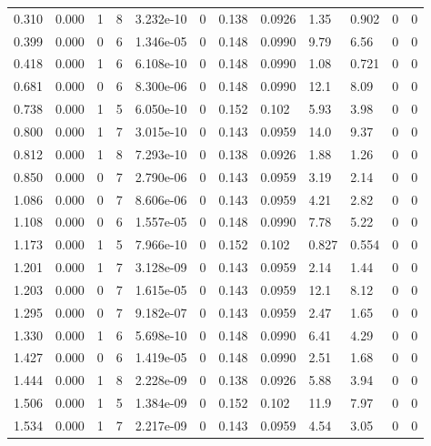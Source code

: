 \documentclass[preview]{standalone}
\begin{document}
{{\begin{tabular}{L{1.2cm}C{1.2cm} C{0.3cm}C{0.5cm} C{1.4cm}C{1.4cm} C{1.4cm}C{1.4cm} C{1.6cm}C{1.6cm} C{1.6cm}C{1.6cm}}
  0.310  &  0.000  & 1     &  8 &  3.232e-10  & 0  &  0.138&   0.0926& 1.35 & 0.902   &  0 & 0  \\ 
  0.399  &  0.000  & 0     &  6 &  1.346e-05  & 0  &  0.148&   0.0990& 9.79 & 6.56   &  0 & 0  \\ 
  0.418  &  0.000  & 1     &  6 &  6.108e-10  & 0  &  0.148&   0.0990& 1.08 & 0.721   &  0 & 0  \\ 
  0.681  &  0.000  & 0     &  6 &  8.300e-06  & 0  &  0.148&   0.0990& 12.1 & 8.09   &  0 & 0  \\ 
  0.738  &  0.000  & 1     &  5 &  6.050e-10  & 0  &  0.152&   0.102& 5.93 & 3.98   &  0 & 0  \\ 
  0.800  &  0.000  & 1     &  7 &  3.015e-10  & 0  &  0.143&   0.0959& 14.0 & 9.37   &  0 & 0  \\ 
  0.812  &  0.000  & 1     &  8 &  7.293e-10  & 0  &  0.138&   0.0926& 1.88 & 1.26   &  0 & 0  \\ 
  0.850  &  0.000  & 0     &  7 &  2.790e-06  & 0  &  0.143&   0.0959& 3.19 & 2.14   &  0 & 0  \\ 
  1.086  &  0.000  & 0     &  7 &  8.606e-06  & 0  &  0.143&   0.0959& 4.21 & 2.82   &  0 & 0  \\ 
  1.108  &  0.000  & 0     &  6 &  1.557e-05  & 0  &  0.148&   0.0990& 7.78 & 5.22   &  0 & 0  \\ 
  1.173  &  0.000  & 1     &  5 &  7.966e-10  & 0  &  0.152&   0.102& 0.827 & 0.554   &  0 & 0  \\ 
  1.201  &  0.000  & 1     &  7 &  3.128e-09  & 0  &  0.143&   0.0959& 2.14 & 1.44   &  0 & 0  \\ 
  1.203  &  0.000  & 0     &  7 &  1.615e-05  & 0  &  0.143&   0.0959& 12.1 & 8.12   &  0 & 0  \\ 
  1.295  &  0.000  & 0     &  7 &  9.182e-07  & 0  &  0.143&   0.0959& 2.47 & 1.65   &  0 & 0  \\ 
  1.330  &  0.000  & 1     &  6 &  5.698e-10  & 0  &  0.148&   0.0990& 6.41 & 4.29   &  0 & 0  \\ 
  1.427  &  0.000  & 0     &  6 &  1.419e-05  & 0  &  0.148&   0.0990& 2.51 & 1.68   &  0 & 0  \\ 
  1.444  &  0.000  & 1     &  8 &  2.228e-09  & 0  &  0.138&   0.0926& 5.88 & 3.94   &  0 & 0  \\ 
  1.506  &  0.000  & 1     &  5 &  1.384e-09  & 0  &  0.152&   0.102& 11.9 & 7.97   &  0 & 0  \\ 
  1.534  &  0.000  & 1     &  7 &  2.217e-09  & 0  &  0.143&   0.0959& 4.54 & 3.05   &  0 & 0  \\ 

\end{tabular}}}
\end{document}
